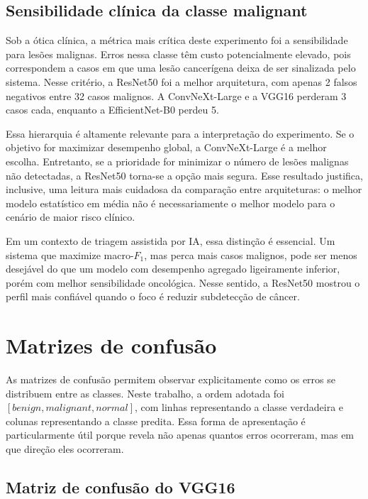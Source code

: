 \documentclass[tcc,capa]{texufpel}
\begin{document}
\subsection{Sensibilidade clínica da classe malignant}

Sob a ótica clínica, a métrica mais crítica deste experimento foi a sensibilidade para lesões malignas. Erros nessa classe têm custo potencialmente elevado, pois correspondem a casos em que uma lesão cancerígena deixa de ser sinalizada pelo sistema. Nesse critério, a ResNet50 foi a melhor arquitetura, com apenas 2 falsos negativos entre 32 casos malignos. A ConvNeXt-Large e a VGG16 perderam 3 casos cada, enquanto a EfficientNet-B0 perdeu 5.

Essa hierarquia é altamente relevante para a interpretação do experimento. Se o objetivo for maximizar desempenho global, a ConvNeXt-Large é a melhor escolha. Entretanto, se a prioridade for minimizar o número de lesões malignas não detectadas, a ResNet50 torna-se a opção mais segura. Esse resultado justifica, inclusive, uma leitura mais cuidadosa da comparação entre arquiteturas: o melhor modelo estatístico em média não é necessariamente o melhor modelo para o cenário de maior risco clínico.

Em um contexto de triagem assistida por IA, essa distinção é essencial. Um sistema que maximize macro-\(F_1\), mas perca mais casos malignos, pode ser menos desejável do que um modelo com desempenho agregado ligeiramente inferior, porém com melhor sensibilidade oncológica. Nesse sentido, a ResNet50 mostrou o perfil mais confiável quando o foco é reduzir subdetecção de câncer.

\section{Matrizes de confusão}

As matrizes de confusão permitem observar explicitamente como os erros se distribuem entre as classes. Neste trabalho, a ordem adotada foi \([\textit{benign}, \textit{malignant}, \textit{normal}]\), com linhas representando a classe verdadeira e colunas representando a classe predita. Essa forma de apresentação é particularmente útil porque revela não apenas quantos erros ocorreram, mas em que direção eles ocorreram.

\subsection{Matriz de confusão do VGG16}
\end{document}
